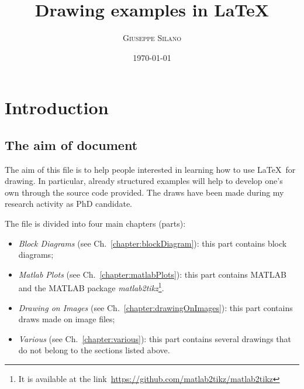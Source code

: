 \documentclass[11pt,a4paper,oneside,english]{book}
\begin{document}
\frontmatter

\renewcommand{\theequation}{\arabic{equation}}
\renewcommand{\thesection}{\arabic{section}}  
\renewcommand{\theequation}{\arabic{chapter}.\arabic{equation}}
\renewcommand{\thesection}{\arabic{chapter}.\arabic{section}}
\setcounter{chapter}{1}

\title{
	\textbf{\huge{Drawing examples in \LaTeX}}
	\\
	\vspace{1cm}
}
	
\author{\textsc{Giuseppe Silano}
\date{\today}
} 

\maketitle

\mainmatter


\tableofcontents

\setcounter{page}{0}
\setcounter{chapter}{0}

\onehalfspacing

\chapter*{Introduction}

\section*{The aim of document}
\label{sec:aimOfTheDocument}

The aim of this file is to help people interested in learning how to use \LaTeX~for drawing. In 
particular, already structured examples will help to develop one's own through the source code 
provided. The draws have been made during my research activity as PhD candidate.

The file is divided into four main chapters (parts):

\begin{itemize}
	
	\item \textit{Block Diagrams} (see Ch.~\ref{chapter:blockDiagram}): this part contains block 
	diagrams;
	
	\item \textit{Matlab Plots} (see Ch.~\ref{chapter:matlabPlots}): this part contains 
	MATLAB\textsuperscript{\textregistered} and the 
	MATLAB package \textit{matlab2tikz}\footnote{It is available at the 
	link~\url{https://github.com/matlab2tikz/matlab2tikz}}.
	
	\item \textit{Drawing on Images} (see Ch.~\ref{chapter:drawingOnImages}): this part contains 
	draws made on image files;
	
	\item \textit{Various} (see Ch.~\ref{chapter:various}): this part contains several drawings 
	that do not belong to the sections 
	listed above.
	
\end{itemize}


\mainmatter


\onehalfspacing





\end{document}
